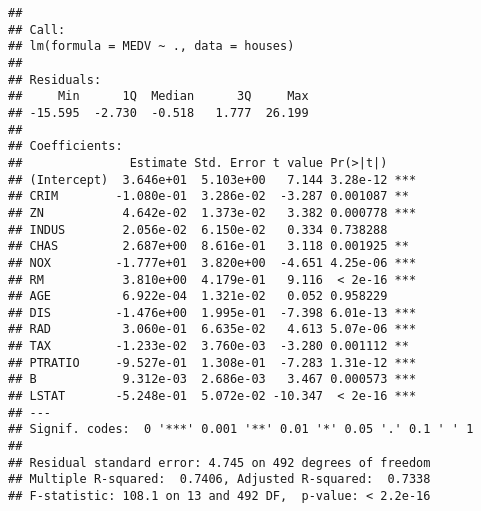 \documentclass[]{article}
\newenvironment{Shaded}{\begin{snugshade}}{\end{snugshade}}
\newcommand{\KeywordTok}[1]{\textcolor[rgb]{0.13,0.29,0.53}{\textbf{{#1}}}}
\newcommand{\DataTypeTok}[1]{\textcolor[rgb]{0.13,0.29,0.53}{{#1}}}
\newcommand{\DecValTok}[1]{\textcolor[rgb]{0.00,0.00,0.81}{{#1}}}
\newcommand{\StringTok}[1]{\textcolor[rgb]{0.31,0.60,0.02}{{#1}}}
\newcommand{\CommentTok}[1]{\textcolor[rgb]{0.56,0.35,0.01}{\textit{{#1}}}}
\newcommand{\NormalTok}[1]{{#1}}
\numberwithin{equation}{section}
\begin{document}
\begin{verbatim}
## 
## Call:
## lm(formula = MEDV ~ ., data = houses)
## 
## Residuals:
##     Min      1Q  Median      3Q     Max 
## -15.595  -2.730  -0.518   1.777  26.199 
## 
## Coefficients:
##               Estimate Std. Error t value Pr(>|t|)    
## (Intercept)  3.646e+01  5.103e+00   7.144 3.28e-12 ***
## CRIM        -1.080e-01  3.286e-02  -3.287 0.001087 ** 
## ZN           4.642e-02  1.373e-02   3.382 0.000778 ***
## INDUS        2.056e-02  6.150e-02   0.334 0.738288    
## CHAS         2.687e+00  8.616e-01   3.118 0.001925 ** 
## NOX         -1.777e+01  3.820e+00  -4.651 4.25e-06 ***
## RM           3.810e+00  4.179e-01   9.116  < 2e-16 ***
## AGE          6.922e-04  1.321e-02   0.052 0.958229    
## DIS         -1.476e+00  1.995e-01  -7.398 6.01e-13 ***
## RAD          3.060e-01  6.635e-02   4.613 5.07e-06 ***
## TAX         -1.233e-02  3.760e-03  -3.280 0.001112 ** 
## PTRATIO     -9.527e-01  1.308e-01  -7.283 1.31e-12 ***
## B            9.312e-03  2.686e-03   3.467 0.000573 ***
## LSTAT       -5.248e-01  5.072e-02 -10.347  < 2e-16 ***
## ---
## Signif. codes:  0 '***' 0.001 '**' 0.01 '*' 0.05 '.' 0.1 ' ' 1
## 
## Residual standard error: 4.745 on 492 degrees of freedom
## Multiple R-squared:  0.7406, Adjusted R-squared:  0.7338 
## F-statistic: 108.1 on 13 and 492 DF,  p-value: < 2.2e-16
\end{verbatim}

\begin{Shaded}
\end{Shaded}
\end{document}
